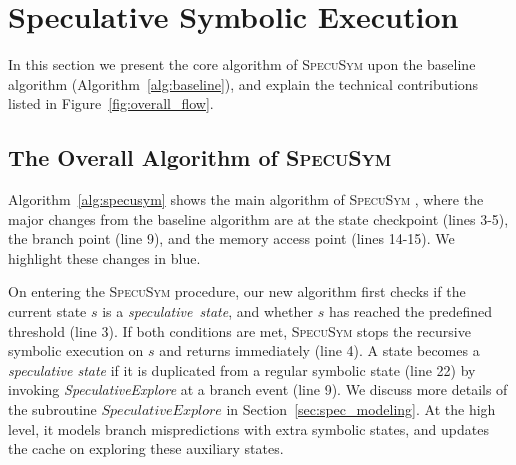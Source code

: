 \documentclass[sigconf, review]{acmart}
\newcommand\ignore[1]{}
\newcommand{\SpecuSym}{\textsc{SpecuSym} }
\begin{document}
\ignore{
Our modeling approach is sound and elegant. Focusing on the worst 
case predication, we avoid missing any speculated branch that may 
cause leaks. 
}


\section{Speculative Symbolic Execution}
\label{sec:specuSE}

In this section we present the core algorithm of \SpecuSym upon the baseline 
algorithm (Algorithm~\ref{alg:baseline}), and explain the technical 
contributions listed in Figure~\ref{fig:overall_flow}. 


\subsection{The Overall Algorithm of \SpecuSym}
\label{sec:specu_alg}

Algorithm~\ref{alg:specusym} shows the main algorithm of \SpecuSym, 
where the major changes from the baseline algorithm are at the state 
checkpoint (lines 3-5), the branch point (line 9), and the memory 
access point (lines 14-15). We highlight these changes in blue. 


On entering the \SpecuSym procedure, our new algorithm first checks 
if the current state $s$ is a \textit{speculative~state}, and whether 
$s$ has reached the predefined threshold (line 3). If both conditions
are met, \SpecuSym stops the recursive symbolic execution on $s$ and 
returns immediately (line 4). A state becomes a \textit{speculative 
state} if it is duplicated from a regular symbolic state (line 22) by
invoking \textit{SpeculativeExplore} at a branch event (line 9). 
We discuss more details of the subroutine $\mathit{SpeculativeExplore}$ 
in Section~\ref{sec:spec_modeling}. At the high level, it models branch 
mispredictions with extra symbolic states, and updates the cache on 
exploring these auxiliary states.
\end{document}
